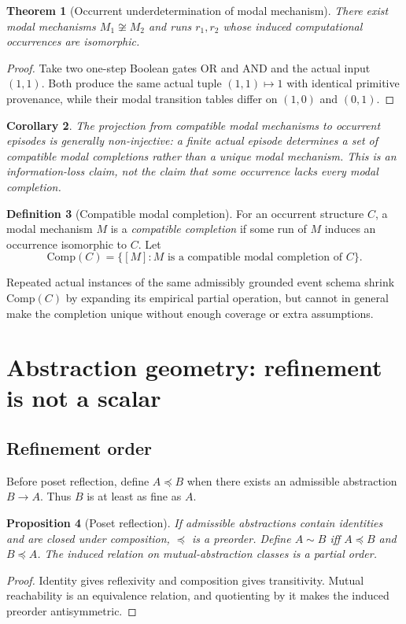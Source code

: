 \documentclass[11pt,a4paper]{article}
\theoremstyle{clean}
\newtheorem{theorem}{Theorem}[section]
\newtheorem{proposition}[theorem]{Proposition}
\newtheorem{corollary}[theorem]{Corollary}
\theoremstyle{definition}
\newtheorem{definition}[theorem]{Definition}
\begin{document}
\begin{theorem}[Occurrent underdetermination of modal mechanism]
There exist modal mechanisms $M_1\not\cong M_2$ and runs $r_1,r_2$ whose induced computational occurrences are isomorphic.
\end{theorem}
\begin{proof}
Take two one-step Boolean gates OR and AND and the actual input $(1,1)$. Both produce the same actual tuple $(1,1)\mapsto1$ with identical primitive provenance, while their modal transition tables differ on $(1,0)$ and $(0,1)$.
\end{proof}

\begin{corollary}
The projection from compatible modal mechanisms to occurrent episodes is generally non-injective: a finite actual episode determines a set of compatible modal completions rather than a unique modal mechanism. This is an information-loss claim, not the claim that some occurrence lacks every modal completion.
\end{corollary}

\begin{definition}[Compatible modal completion]
For an occurrent structure $C$, a modal mechanism $M$ is a \emph{compatible completion} if some run of $M$ induces an occurrence isomorphic to $C$. Let
\[
\mathrm{Comp}(C)=\{[M]:M\text{ is a compatible modal completion of }C\}.
\]
\end{definition}

Repeated actual instances of the same admissibly grounded event schema shrink $\mathrm{Comp}(C)$ by expanding its empirical partial operation, but cannot in general make the completion unique without enough coverage or extra assumptions.

\section{Abstraction geometry: refinement is not a scalar}

\subsection{Refinement order}

Before poset reflection, define $A\preceq B$ when there exists an admissible abstraction $B\to A$. Thus $B$ is at least as fine as $A$.

\begin{proposition}[Poset reflection]
If admissible abstractions contain identities and are closed under composition, $\preceq$ is a preorder. Define $A\sim B$ iff $A\preceq B$ and $B\preceq A$. The induced relation on mutual-abstraction classes is a partial order.
\end{proposition}
\begin{proof}
Identity gives reflexivity and composition gives transitivity. Mutual reachability is an equivalence relation, and quotienting by it makes the induced preorder antisymmetric.
\end{proof}
\end{document}
